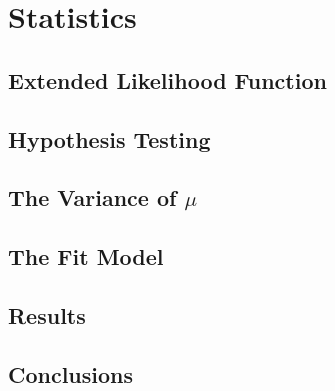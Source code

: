 \chapter{Statistics}
\label{chap:statistics}


\section{Extended Likelihood Function}
\label{chap:statistics:sec:likelihood}


\section{Hypothesis Testing}
\label{chap:statistics:sec:hypothesis}


\section{The Variance of $\mu$}
\label{chap:statistics:sec:mu_hat_error}


\section{The Fit Model}
\label{chap:statistics:sec:fit_model}


\section{Results}
\label{chap:statistics:sec:results}


\section{Conclusions}
\label{chap:statistics:sec:conclusions}


